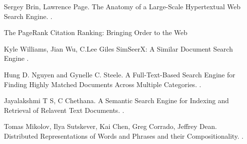 \documentclass[UTF8]{article}
\begin{document}
	
	  
	\begin{thebibliography}{1}
		
		Sergey Brin, Lawrence Page.
		\newblock The Anatomy of a Large-Scale Hypertextual Web Search Engine.
		.
		
		\newblock The PageRank Citation Ranking:
		Bringing Order to the Web
		
		
		Kyle Williams, Jian Wu, C.Lee Giles
		\newblock SimSeerX: A Similar Document Search Engine
		.
		
		Hung D. Nguyen and Gynelle C. Steele.
		\newblock A Full-Text-Based Search Engine for Finding Highly Matched Documents Across Multiple Categories.
		.
		
		Jayalakshmi T S, C Chethana.
		\newblock A Semantic Search Engine for Indexing and Retrieval of Relavent Text Documents.
		.	
		
		Tomas Mikolov, Ilya Sutskever, Kai Chen, Greg Corrado, Jeffrey Dean.
		\newblock Distributed Representations of Words and Phrases and their Compositionality.
		.
		
		
		
	\end{thebibliography}
	
\end{document}
